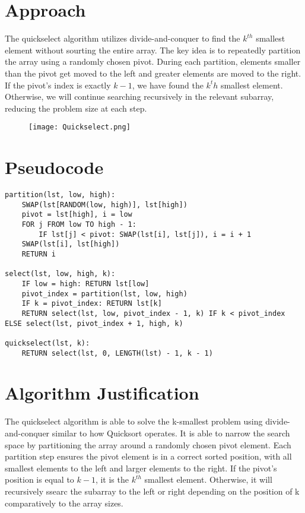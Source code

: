 \documentclass{labReport}
\begin{document}
\newpage
\begin{multicols*}{2}
\raggedcolumns



\section{Approach}
The quickselect algorithm utilizes divide-and-conquer to find the $k^{th}$ smallest element without sourting the entire array. The key idea is to repeatedly partition the array using a randomly chosen pivot. During each partition, elements smaller than the pivot get moved to the left and greater elements are moved to the right. If the pivot's index is exactly $k - 1$, we have found the $k^th$ smallest element. Otherwise, we will continue searching recursively in the relevant subarray, reducing the problem size at each step. 
\begin{figure}
     \centering
     \texttt{[image: Quickselect.png]}
\end{figure} 



\section{Pseudocode}
\begin{verbatim}
partition(lst, low, high):
    SWAP(lst[RANDOM(low, high)], lst[high])
    pivot = lst[high], i = low
    FOR j FROM low TO high - 1:
        IF lst[j] < pivot: SWAP(lst[i], lst[j]), i = i + 1
    SWAP(lst[i], lst[high])
    RETURN i

select(lst, low, high, k):
    IF low = high: RETURN lst[low]
    pivot_index = partition(lst, low, high)
    IF k = pivot_index: RETURN lst[k]
    RETURN select(lst, low, pivot_index - 1, k) IF k < pivot_index ELSE select(lst, pivot_index + 1, high, k)

quickselect(lst, k):
    RETURN select(lst, 0, LENGTH(lst) - 1, k - 1)
\end{verbatim}

\section{Algorithm Justification}
The quickselect algorithm is able to solve the k-smallest problem using divide-and-conquer similar to how Quicksort operates. It is able to narrow the search space by partitioning the array around a randomly chosen pivot element. Each partition step ensures the pivot element is in a correct sorted position, with all smallest elements to the left and larger elements to the right. If the pivot's position is equal to $k - 1$, it is the $k^{th}$ smallest element. Otherwise, it will recursively ssearc the subarray to the left or right depending on the position of k comparatively to the array sizes.



\end{multicols*}
\end{document}
